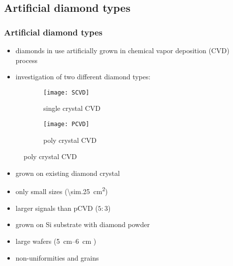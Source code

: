\subsection{Artificial diamond types}
\begin{frame}
	\frametitle{Artificial diamond types}
	\begin{itemize}
		\item diamonds in use artificially grown in chemical vapor deposition (CVD) process
		\item investigation of two different diamond types:
	\end{itemize}
	\begin{figure}[htbp] 
		\begin{center}
			\begin{subfigure}{0.45\textwidth}  
				\centering 
				\texttt{[image: SCVD]}
				\caption{single crystal CVD}
			\end{subfigure}
			\begin{subfigure}{0.45\textwidth} 
				\centering 
				\texttt{[image: PCVD]}
				\caption{poly crystal CVD} 	
			\end{subfigure} 
		\end{center}
	\end{figure}
	\begin{minipage}{5.5cm}
		\begin{itemize}
			\item grown on existing diamond crystal
			\item only small sizes (\SI{\sim.25}{cm^2})
			\item larger signals than pCVD ($5:3$)
		\end{itemize}
	\end{minipage}
	\hspace*{2pt}
	\begin{minipage}{5.5cm}
		\begin{itemize}
			\item grown on Si substrate with diamond powder
			\item large wafers (\SIrange{5}{6}{cm} \diameter)
			\item non-uniformities and grains
		\end{itemize}
	\end{minipage}
\end{frame}

